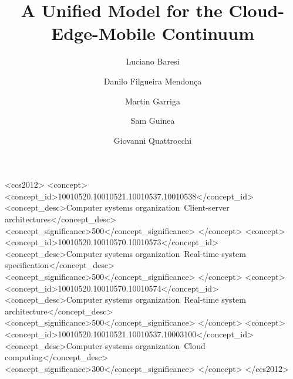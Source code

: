 \documentclass[manuscript, screen]{acmart} %
\begin{document}
\title{A Unified Model for the Cloud-Edge-Mobile Continuum} 

\author{Luciano Baresi}
\author{Danilo Filgueira Mendonça}
\author{Martin Garriga}
\author{Sam Guinea}
\author{Giovanni Quattrocchi}

\renewcommand\shortauthors{Baresi, L. et al}

\begin{abstract}
%
\end{abstract}


%
%
\begin{CCSXML}
<ccs2012>
<concept>
<concept_id>10010520.10010521.10010537.10010538</concept_id>
<concept_desc>Computer systems organization~Client-server architectures</concept_desc>
<concept_significance>500</concept_significance>
</concept>
<concept>
<concept_id>10010520.10010570.10010573</concept_id>
<concept_desc>Computer systems organization~Real-time system specification</concept_desc>
<concept_significance>500</concept_significance>
</concept>
<concept>
<concept_id>10010520.10010570.10010574</concept_id>
<concept_desc>Computer systems organization~Real-time system architecture</concept_desc>
<concept_significance>500</concept_significance>
</concept>
<concept>
<concept_id>10010520.10010521.10010537.10003100</concept_id>
<concept_desc>Computer systems organization~Cloud computing</concept_desc>
<concept_significance>300</concept_significance>
</concept>
</ccs2012>
\end{CCSXML}
\end{document}
